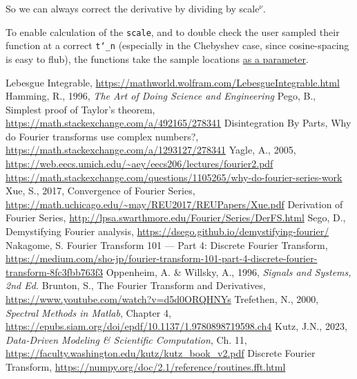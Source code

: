 \documentclass[10pt]{article}
\begin{document}
So we can always correct the derivative by dividing by scale$^\nu$.\newline

To enable calculation of the \texttt{scale}, and to double check the user sampled their function at a correct \texttt{t\char`_n} (especially in the Chebyshev case, since cosine-spacing is easy to flub), the functions take the sample locations \href{https://pavelkomarov.com/spectral-derivatives/specderiv.html}{as a parameter}.

\printendnotes

\begin{thebibliography}{99} %
\raggedright
{}
	Lebesgue Integrable, \url{https://mathworld.wolfram.com/LebesgueIntegrable.html}
	Hamming, R., 1996, \textit{The Art of Doing Science and Engineering}
	Pego, B., Simplest proof of Taylor's theorem, \url{https://math.stackexchange.com/a/492165/278341}
	Disintegration By Parts, Why do Fourier transforms use complex numbers?, \url{https://math.stackexchange.com/a/1293127/278341}
	Yagle, A., 2005, \url{https://web.eecs.umich.edu/~aey/eecs206/lectures/fourier2.pdf}
	\url{https://math.stackexchange.com/questions/1105265/why-do-fourier-series-work}
	Xue, S., 2017, Convergence of Fourier Series, \url{https://math.uchicago.edu/~may/REU2017/REUPapers/Xue.pdf}
	Derivation of Fourier Series, \url{http://lpsa.swarthmore.edu/Fourier/Series/DerFS.html}
	Sego, D., Demystifying Fourier analysis, \url{https://dsego.github.io/demystifying-fourier/}
	Nakagome, S. Fourier Transform 101 — Part 4: Discrete Fourier Transform, \url{https://medium.com/sho-jp/fourier-transform-101-part-4-discrete-fourier-transform-8fc3fbb763f3}
	Oppenheim, A. \& Willsky, A., 1996, \textit{Signals and Systems, 2nd Ed.}
	Brunton, S., The Fourier Transform and Derivatives, \url{https://www.youtube.com/watch?v=d5d0ORQHNYs}
	Trefethen, N., 2000, \textit{Spectral Methods in Matlab}, Chapter 4, \url{https://epubs.siam.org/doi/epdf/10.1137/1.9780898719598.ch4}
	Kutz, J.N., 2023, \textit{Data-Driven Modeling \& Scientific Computation}, Ch. 11, \url{https://faculty.washington.edu/kutz/kutz_book_v2.pdf}
	Discrete Fourier Transform, \url{https://numpy.org/doc/2.1/reference/routines.fft.html}

\end{thebibliography}
\end{document}
